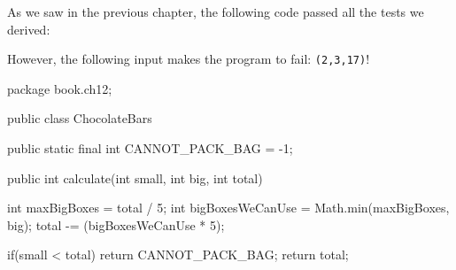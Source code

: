 As we saw in the previous chapter, the following code passed all the
tests we derived:

\begin{Shaded}
\begin{Highlighting}[]
 
       \NormalTok{;}

      \NormalTok{(}
        \NormalTok{;}
\NormalTok{);}

\NormalTok{    \}}
\NormalTok{\}}
\end{Highlighting}
\end{Shaded}

However, the following input makes the program to fail:
\texttt{(2,3,17)}!

package book.ch12;

public class ChocolateBars {

    public static final int CANNOT_PACK_BAG = -1;

    public int calculate(int small, int big, int total) {
        int maxBigBoxes = total / 5;
        int bigBoxesWeCanUse = Math.min(maxBigBoxes, big);
        total -= (bigBoxesWeCanUse * 5);

        if(small < total)
            return CANNOT_PACK_BAG;
        return total;

    }
}


